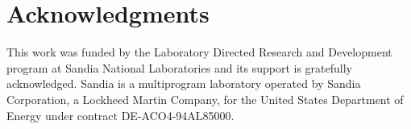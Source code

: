 \documentclass[11pt,oneside]{elsart}
\begin{document}
\section*{Acknowledgments}
This work was funded by the Laboratory Directed Research and Development program at Sandia National Laboratories and its support is gratefully acknowledged. Sandia is a multiprogram laboratory operated by Sandia Corporation, a Lockheed Martin Company, for the United States Department of Energy under contract DE-ACO4-94AL85000.



\end{document}
